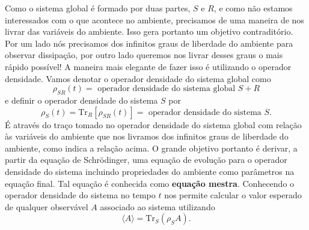 \documentclass{article}
\begin{document}
Como o sistema global é formado por duas partes, $S$ e $R$, e como não estamos interessados com o que acontece no ambiente, precisamos de uma maneira de nos livrar das variáveis do ambiente. Isso gera portanto um objetivo contraditório. Por um lado nós precisamos dos infinitos graus de liberdade do ambiente para observar dissipação, por outro lado queremos nos livrar desses graus o mais rápido possível! A maneira mais elegante de fazer isso é utilizando o operador densidade. Vamos denotar o operador densidade do sistema global como
\begin{equation}
    \rho_{SR}(t) = \text{ operador densidade do sistema global } S + R
\end{equation}
e definir o operador densidade do sistema $S$ por
\begin{equation}
    \rho_S (t) = \text{Tr}_R [ \rho_{SR}(t) ] = \text{ operador densidade do sistema } S.
\end{equation}
É através do traço tomado no operador densidade do sistema global com relação às variáveis do ambiente que nos livramos dos infinitos graus de liberdade do ambiente, como indica a relação acima. O grande objetivo portanto é derivar, a partir da equação de Schrödinger, uma equação de evolução para o operador densidade do sistema incluindo propriedades do ambiente como parâmetros na equação final. Tal equação é conhecida como \textbf{equação mestra}. Conhecendo o operador densidade do sistema no tempo $t$ nos permite calcular o valor esperado de qualquer observável $A$ associado ao sistema utilizando 
\begin{equation}
    \langle A \rangle = \text{Tr}_S (\rho_S A).
\end{equation}
\end{document}
